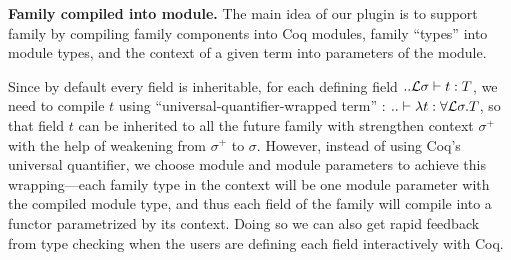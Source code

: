 \textbf{Family compiled into module.} The main idea of our plugin is to support family by compiling
family components into Coq modules, family ``types'' into module types, and the context of a given term
into parameters of the module. 

Since by default every field is inheritable, for each defining field $ .. {\mathcal{L}}\sigma \vdash t : T $, we need to compile $t$ using
``universal-quantifier-wrapped term'' : $.. \vdash \lambda t : \forall
{\mathcal{L}} \sigma. T$, so that field $t$ can be inherited to all the future family with strengthen context $\sigma^+$ with the help of weakening from $\sigma^+$ to $\sigma$.  However, instead of using Coq's universal quantifier, we choose module and module parameters to achieve this wrapping---each
family type in the context will be one module parameter
with the compiled module type, and thus each field of the family will
compile into a functor parametrized by its context. Doing so we can also
get rapid feedback from type checking when the users are defining each
field interactively with Coq.
